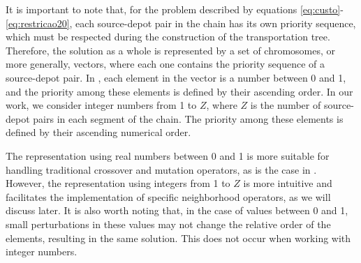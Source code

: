 \documentclass[sn-nature]{sn-jnl}%
\theoremstyle{thmstyleone}%
\theoremstyle{thmstyletwo}%
\theoremstyle{thmstylethree}%
\begin{document}

It is important to note that, for the problem described by equations \eqref{eq:custo}-\eqref{eq:restricao20}, each source-depot pair in the chain has its own priority sequence, which must be respected during the construction of the transportation tree. Therefore, the solution as a whole is represented by a set of chromosomes, or more generally, vectors, where each one contains the priority sequence of a source-depot pair. In \cite{rajabi2023utilizing}, each element in the vector is a number between 0 and 1, and the priority among these elements is defined by their ascending order. In our work, we consider integer numbers from 1 to 
$Z$, where $Z$ is the number of source-depot pairs in each segment of the chain. The priority among these elements is defined by their ascending numerical order.

The representation using real numbers between 0 and 1 is more suitable for handling traditional crossover and mutation operators, as is the case in \cite{rajabi2023utilizing}. However, the representation using integers from 1 to $Z$ is more intuitive and facilitates the implementation of specific neighborhood operators, as we will discuss later. It is also worth noting that, in the case of values between 0 and 1, small perturbations in these values may not change the relative order of the elements, resulting in the same solution. This does not occur when working with integer numbers.
\end{document}
